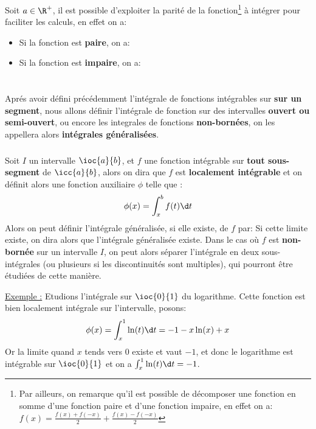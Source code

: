 Soit \(a \in \R^+\), il est possible d'exploiter la parité de la fonction\footnote[3]{Par ailleurs, on remarque qu'il est possible de décomposer une fonction en somme d'une fonction paire et d'une fonction impaire, en effet on a:
\(f(x) = \frac{f(x) + f(-x)}{2} + \frac{f(x) - f(-x)}{2}\)} à intégrer pour faciliter les calculs, en effet on a:
\begin{itemize}
   \item Si la fonction est \textbf{paire}, on a:
   \item Si la fonction est \textbf{impaire}, on a:
\end{itemize}


\chapter*{}
Aprés avoir défini précédemment l'intégrale de fonctions intégrables sur \textbf{sur un segment}, nous allons définir l'intégrale de fonction sur des intervalles \textbf{ouvert ou semi-ouvert}, ou encore les integrales de fonctions \textbf{non-bornées}, on les appellera alors \textbf{intégrales généralisées}.
\subsection*{}
Soit \(I\) un intervalle \(\ioc{a}{b}\), et \(f\) une fonction intégrable sur \textbf{tout sous-segment} de \(\icc{a}{b}\), alors on dira que \(f\) est \textbf{localement intégrable} et on définit alors une fonction auxiliaire \(\phi\) telle que :
\[
   \phi(x) = \int_{x}^{b} f(t) \d t
\]
Alors on peut définir l'intégrale généralisée, si elle existe, de \(f\) par:
Si cette limite existe, on dira alors que l'intégrale généralisée existe.\+ 
Dans le cas où \(f\) est \textbf{non-bornée} sur un intervalle \(I\), on peut alors séparer l'intégrale en deux sous-intégrales (ou plusieurs si les discontinuités sont multiples), qui pourront être étudiées de cette manière.\<

\underline{Exemple :} Etudions l'intégrale sur \(\ioc{0}{1}\) du logarithme. Cette fonction est bien localement intégrale sur l'intervalle, posons:
\[
   \phi(x) = \int_{x}^{1} \ln(t) \d t = - 1 - x\ln(x) + x 
\]
Or la limite quand \(x\) tends vers \(0\) existe et vaut \(-1\), et donc le logarithme est intégrable sur \(\ioc{0}{1}\) et on a \(\int_{x}^{1} \ln(t) \d t = -1\).
